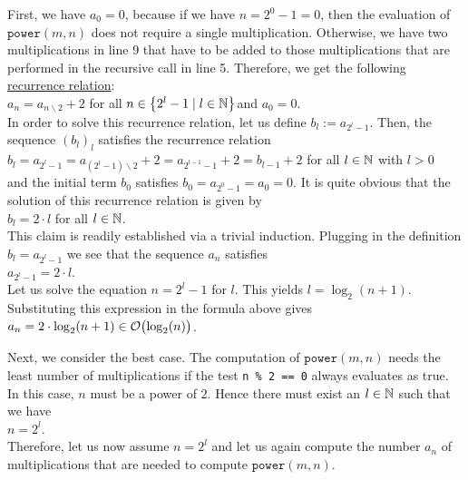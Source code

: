 First, we have $a_0 = 0$, because if we have $n = 2^0 - 1 = 0$, then the evaluation of 
$\mathtt{power}(m, n)$ does not require a single multiplication.
Otherwise, we have two multiplications in line 9 that have to be added to those multiplications
that are performed in the recursive call in line 5.  Therefore, we get the following
\href{http://en.wikipedia.org/wiki/Recurrence_relation}{recurrence relation}:
\\[0.2cm]
\hspace*{1.3cm}
$a_n = a_{n \backslash 2} + 2$ \qquad for all $n \in \left\{2^l - 1 \mid l \in {\mathbb N}\right\}$\quad and $a_0 = 0$. 
\\[0.2cm]
In order to solve this recurrence relation, let us define $b_l := a_{2^l-1}$.  Then, the sequence
$(b_l)_l$ 
satisfies the recurrence relation
 \\[0.2cm]
\hspace*{1.3cm} 
$b_l = a_{2^l-1} = a_{(2^l-1) \backslash 2} + 2 = a_{2^{l-1}-1} + 2 = b_{l-1} +2$ \qquad for all $l\in{\mathbb N}$ with
$l > 0$
\\[0.2cm]
and the initial term $b_0$ satisfies $b_0 = a_{2^0-1} = a_0 = 0$.  It is quite obvious that the
solution of this recurrence relation is given by
\\[0.2cm]
\hspace*{1.3cm} $b_l = 2 \cdot l$ \qquad for all $l \in {\mathbb N}$. 
\\[0.2cm] 
This claim is readily established via a trivial induction.  Plugging in the definition $b_l = a_{2^l-1}$ we
see that the sequence $a_n$ satisfies \\[0.2cm]
\hspace*{1.3cm} $a_{2^l-1} = 2 \cdot l$. 
\\[0.2cm]
Let us solve the equation $n = 2^l - 1$ for $l$.  This yields
 $l =
\log_2(n+1)$.  Substituting this expression in the formula above gives \\[0.2cm]
\hspace*{1.3cm} $a_n = 2 \cdot \log_2(n+1) \in \mathcal{O}\bigl(\log_2(n)\bigr)$.
\vspace*{0.3cm}

Next, we consider the best case.  The computation of
$\mathtt{power}(m,n)$ needs the least number of multiplications if the test 
\texttt{n \% 2 == 0}
always evaluates as true.  In this case, $n$ must be a power of $2$.  
Hence there must exist an $l\in {\mathbb N}$ such that we have
 \\[0.2cm]
\hspace*{1.3cm} $n = 2^l$.
 \\[0.2cm]
Therefore, let us now assume $n = 2^l$ and let us again compute the number $a_n$ of multiplications
that are needed to compute $\mathtt{power}(m,n)$. 

